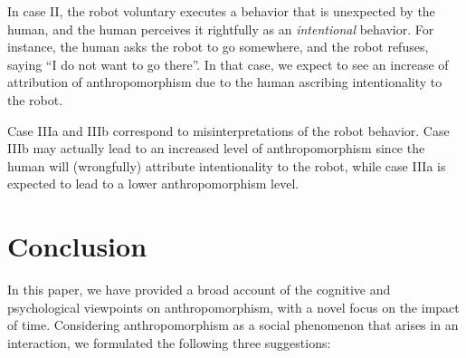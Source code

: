 \documentclass{frontiersSCNS} %
\begin{document}
In case II, the robot voluntary executes a behavior that is unexpected by the
human, and the human perceives it rightfully as an \emph{intentional} behavior.
For instance, the human asks the robot to go somewhere, and the robot refuses,
saying ``I do not want to go there''. In that case, we expect to see an increase
of attribution of anthropomorphism due to the human ascribing intentionality to
the robot.

Case IIIa and IIIb correspond to misinterpretations of the robot behavior. Case
IIIb may actually lead to an increased level of anthropomorphism since the human
will (wrongfully) attribute intentionality to the robot, while case IIIa is
expected to lead to a lower anthropomorphism level.

%
%
%
%
%
%

\section{Conclusion}
\label{sec:conclusion}

In this paper, we have provided a broad account of the cognitive and
psychological viewpoints on anthropomorphism, with a novel focus on the
impact of time. Considering anthropomorphism as a social phenomenon that arises
in an interaction, we formulated the following three suggestions:
\end{document}
